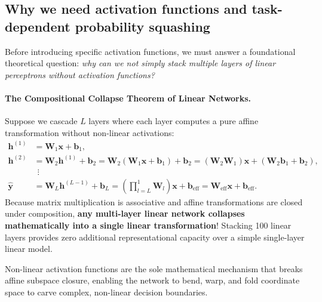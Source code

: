\subsection{Why we need activation functions and task-dependent probability squashing}
\label{sec:continuous_probabilities_softmax}

Before introducing specific activation functions, we must answer a foundational theoretical question: \textit{why can we not simply stack multiple layers of linear perceptrons without activation functions?}

\paragraph{The Compositional Collapse Theorem of Linear Networks.}
Suppose we cascade $L$ layers where each layer computes a pure affine transformation without non-linear activations:
\begin{align}
\mathbf{h}^{(1)} &= \mathbf{W}_1 \mathbf{x} + \mathbf{b}_1, \\
\mathbf{h}^{(2)} &= \mathbf{W}_2 \mathbf{h}^{(1)} + \mathbf{b}_2 = \mathbf{W}_2 (\mathbf{W}_1 \mathbf{x} + \mathbf{b}_1) + \mathbf{b}_2 = (\mathbf{W}_2 \mathbf{W}_1)\mathbf{x} + (\mathbf{W}_2 \mathbf{b}_1 + \mathbf{b}_2), \\
&\;\,\vdots \nonumber \\
\hat{\mathbf{y}} &= \mathbf{W}_L \mathbf{h}^{(L-1)} + \mathbf{b}_L = \left( \prod_{l=L}^1 \mathbf{W}_l \right) \mathbf{x} + \mathbf{b}_{\text{eff}} = \mathbf{W}_{\text{eff}} \mathbf{x} + \mathbf{b}_{\text{eff}}.
\end{align}
Because matrix multiplication is associative and affine transformations are closed under composition, \textbf{any multi-layer linear network collapses mathematically into a single linear transformation}! Stacking 100 linear layers provides zero additional representational capacity over a simple single-layer linear model. 

Non-linear activation functions are the sole mathematical mechanism that breaks affine subspace closure, enabling the network to bend, warp, and fold coordinate space to carve complex, non-linear decision boundaries.

